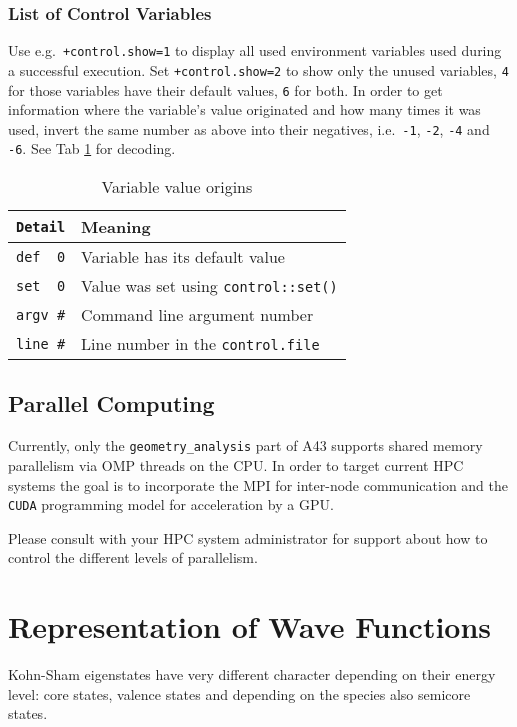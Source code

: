 \documentclass[oribibl]{llncs}
\newcommand{\ttt}[1]{\texttt{#1}}
\newcommand{\codename}{A43}
\begin{document}
\subsubsection{List of Control Variables}
%
Use e.g.~\ttt{+control.show=1} to display all used environment variables used during a successful execution.
Set \ttt{+control.show=2} to show only the unused variables, \ttt{4} for those variables have their default values, \ttt{6} for both.
In order to get information where the variable's value originated and how many times it was used, invert the same number as above into their negatives, i.e.~\ttt{-1}, \ttt{-2}, \ttt{-4} and \ttt{-6}.
See Tab \ref{tab:control-show-details} for decoding. 
%
%
\begin{table}[ht!]
\caption[Variable value origins]{
Variable value origins
} \label{tab:control-show-details}
\centering
\begin{tabular}{|l|l|}
\hline
  	 \ttt{Detail}    & Meaning   \\
\hline
     \verb+def  0+   & Variable has its default value      \\
     \verb+set  0+   & Value was set using \ttt{control::set()} \\
     \ttt{argv \#}   & Command line argument number \\
     \ttt{line \#}   & Line number in the \ttt{control.file} \\
\hline
\end{tabular}
\end{table}


\subsection{Parallel Computing} \label{sec:parallelization}
%
Currently, only the \ttt{geometry\_analysis} part of \codename{} supports shared memory parallelism 
via \ac{OMP} threads on the \ac{CPU}.
In order to target current \ac{HPC} systems 
the goal is to incorporate the \ac{MPI}
for inter-node communication
and the \ttt{CUDA} programming model for acceleration by a \ac{GPU}.

\noindent
Please consult with your \ac{HPC} system administrator for support
about how to control the different levels of parallelism.

\section{Representation of Wave Functions} \label{sec:representation}
%
Kohn-Sham eigenstates have very different character depending on their energy level: core states, valence states and depending on the species also semicore states.
%
%
\end{document}
